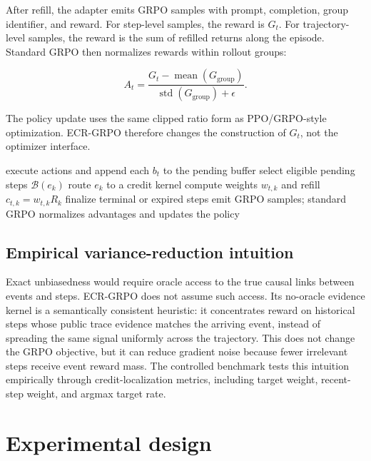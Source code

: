 \documentclass[letterpaper]{article} %
\begin{document}
After refill, the adapter emits GRPO samples with prompt, completion, group identifier, and reward. For step-level samples, the reward is \(G_t\). For trajectory-level samples, the reward is the sum of refilled returns along the episode. Standard GRPO then normalizes rewards within rollout groups:

\[
A_t = \frac{G_t-\operatorname{mean}(G_{\mathrm{group}})}
{\operatorname{std}(G_{\mathrm{group}})+\epsilon}.
\]

The policy update uses the same clipped ratio form as PPO/GRPO-style optimization. ECR-GRPO therefore changes the construction of \(G_t\), not the optimizer interface.

\begin{algorithm}[t]
\caption{Event-conditioned credit refill}
\begin{algorithmic}[1]
    \STATE execute actions and append each \(b_t\) to the pending buffer
      \STATE select eligible pending steps \(\mathcal{B}(e_k)\)
      \STATE route \(e_k\) to a credit kernel
      \STATE compute weights \(w_{t,k}\) and refill \(c_{t,k}=w_{t,k}R_k\)
      \STATE finalize terminal or expired steps
    \ENDFOR
  \ENDFOR
  \STATE emit GRPO samples; standard GRPO normalizes advantages and updates the policy
\ENDFOR
\end{algorithmic}
\end{algorithm}

\subsection{Empirical variance-reduction intuition}

Exact unbiasedness would require oracle access to the true causal links between events and steps. ECR-GRPO does not assume such access. Its no-oracle evidence kernel is a semantically consistent heuristic: it concentrates reward on historical steps whose public trace evidence matches the arriving event, instead of spreading the same signal uniformly across the trajectory. This does not change the GRPO objective, but it can reduce gradient noise because fewer irrelevant steps receive event reward mass. The controlled benchmark tests this intuition empirically through credit-localization metrics, including target weight, recent-step weight, and argmax target rate.

\section{Experimental design}
\end{document}
